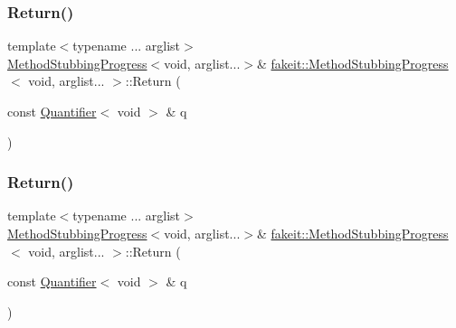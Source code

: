 \mbox{\label{structfakeit_1_1MethodStubbingProgress_3_01void_00_01arglist_8_8_8_01_4_afbc0d4429dddcbab63de1c88176ea0f1}} 
\subsubsection{\texorpdfstring{Return()}{Return()}\hspace{0.1cm}{\footnotesize\ttfamily [8/18]}}
{\footnotesize\ttfamily template$<$typename ... arglist$>$ \\
\mbox{\hyperlink{structfakeit_1_1MethodStubbingProgress}{Method\+Stubbing\+Progress}}$<$void, arglist...$>$\& \mbox{\hyperlink{structfakeit_1_1MethodStubbingProgress}{fakeit\+::\+Method\+Stubbing\+Progress}}$<$ void, arglist... $>$\+::Return (\begin{DoxyParamCaption}\item[{const \mbox{\hyperlink{structfakeit_1_1Quantifier}{Quantifier}}$<$ void $>$ \&}]{q }\end{DoxyParamCaption})\hspace{0.3cm}{\ttfamily [inline]}}

\mbox{\label{structfakeit_1_1MethodStubbingProgress_3_01void_00_01arglist_8_8_8_01_4_afbc0d4429dddcbab63de1c88176ea0f1}} 
\subsubsection{\texorpdfstring{Return()}{Return()}\hspace{0.1cm}{\footnotesize\ttfamily [9/18]}}
{\footnotesize\ttfamily template$<$typename ... arglist$>$ \\
\mbox{\hyperlink{structfakeit_1_1MethodStubbingProgress}{Method\+Stubbing\+Progress}}$<$void, arglist...$>$\& \mbox{\hyperlink{structfakeit_1_1MethodStubbingProgress}{fakeit\+::\+Method\+Stubbing\+Progress}}$<$ void, arglist... $>$\+::Return (\begin{DoxyParamCaption}\item[{const \mbox{\hyperlink{structfakeit_1_1Quantifier}{Quantifier}}$<$ void $>$ \&}]{q }\end{DoxyParamCaption})\hspace{0.3cm}{\ttfamily [inline]}}

